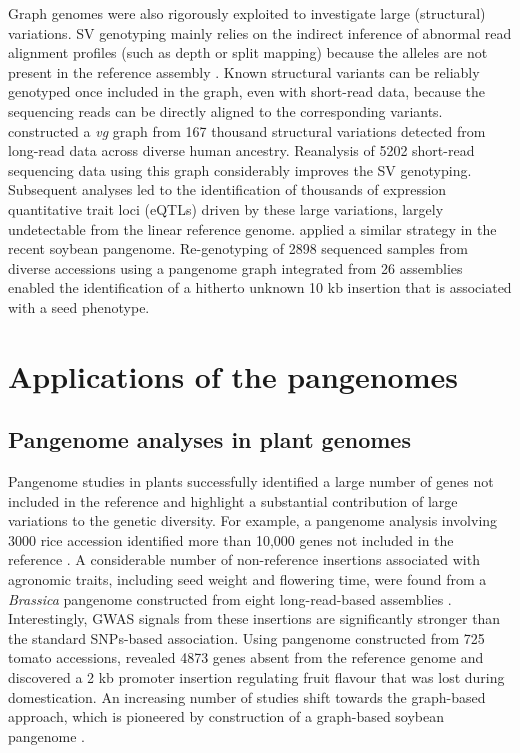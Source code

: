 \documentclass[../main.tex]{subfiles}
\begin{document}
Graph genomes were also rigorously exploited to investigate large (structural) variations. SV genotyping mainly relies on the indirect inference of abnormal read alignment profiles (such as depth or split mapping) because the alleles are not present in the reference assembly \citep{mahmoud2019structural}. Known structural variants can be reliably  genotyped once included in the graph, even with short-read data, because the sequencing reads can be directly aligned to the corresponding variants. \citet{siren2020haplotype} constructed a \emph{vg} graph from 167 thousand structural variations detected from long-read data across diverse human ancestry. Reanalysis of 5202 short-read sequencing data using this graph considerably improves the SV genotyping. Subsequent analyses led to the identification of thousands of expression quantitative trait loci (eQTLs) driven by these large variations, largely undetectable from the linear reference genome. \citet{liu2020pan}  applied a similar strategy in the recent soybean pangenome. Re-genotyping of 2898 sequenced samples from diverse accessions using a pangenome graph integrated from 26 assemblies enabled the identification of a hitherto unknown 10 kb insertion that is associated with a seed phenotype. 

\section{Applications of the pangenomes}

\subsection*{Pangenome analyses in plant genomes}

Pangenome studies in plants successfully identified a large number of genes not included in the reference and highlight a substantial contribution of large variations to the genetic diversity. For example, a pangenome analysis involving 3000 rice accession identified more than 10,000 genes not included in the reference \citep{wang2018genomic}. A considerable number of non-reference insertions associated with agronomic traits, including seed weight and flowering time, were found from a \emph{Brassica} pangenome constructed from eight long-read-based assemblies \citep{song2020eight}. Interestingly, GWAS signals from these insertions are significantly stronger than the standard SNPs-based association. Using pangenome constructed from 725 tomato accessions, \citet{gao2019tomato} revealed 4873 genes absent from the reference genome and discovered a 2 kb promoter insertion regulating fruit flavour that was lost during domestication. An increasing number of studies shift towards the graph-based approach, which is pioneered by construction of a graph-based soybean pangenome \citep{liu2020pan}. 
\end{document}
